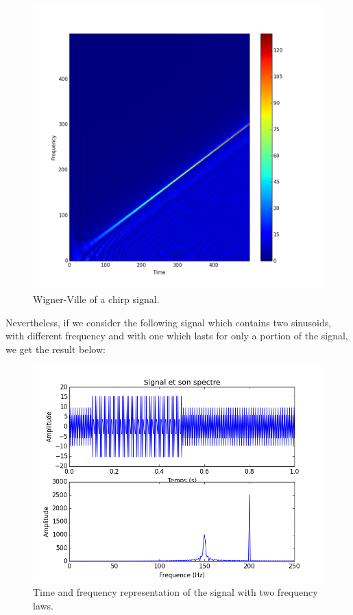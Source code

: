 \begin{figure}[H]
\centering
    \includegraphics[scale=0.5,angle=0]{Images/Chirp_WV.png}
    \caption{Wigner-Ville of a chirp signal.}
    \label{fig:Chirp_WV}
\end{figure}

Nevertheless, if we consider the following signal which contains two sinusoids, with different frequency and with one which lasts for only a portion of the signal, we get the result below:

\begin{figure}[H]
\centering
    \includegraphics[scale=0.5,angle=0]{Images/SignalSimple.png}
    \caption{Time and frequency representation of the signal with two frequency laws.}
    \label{fig:SignalSimple}
\end{figure}

